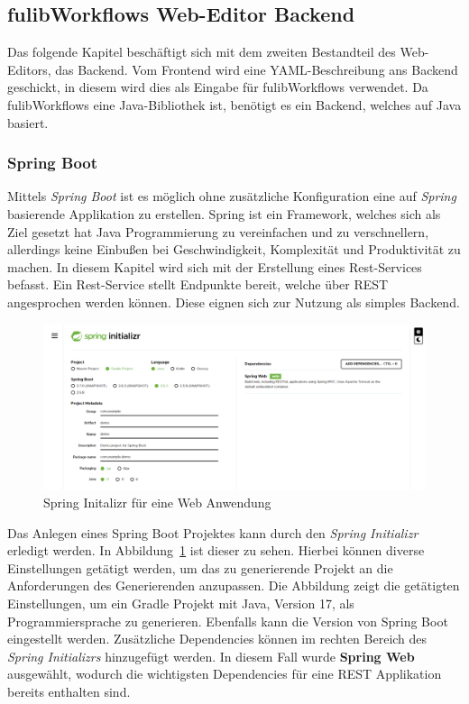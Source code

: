 \subsection{fulibWorkflows Web-Editor Backend}\label{subsec:backend}
Das folgende Kapitel beschäftigt sich mit dem zweiten Bestandteil des Web-Editors, das Backend.
Vom Frontend wird eine YAML-Beschreibung ans Backend geschickt, in diesem wird dies als Eingabe für fulibWorkflows verwendet.
Da fulibWorkflows eine Java-Bibliothek ist, benötigt es ein Backend, welches auf Java basiert.

\subsubsection{Spring Boot}
Mittels \textit{Spring Boot} ist es möglich ohne zusätzliche Konfiguration eine auf \textit{Spring} basierende Applikation zu erstellen.\cite*{springBoot}
Spring ist ein Framework, welches sich als Ziel gesetzt hat Java Programmierung zu vereinfachen und zu verschnellern, allerdings keine Einbußen
bei Geschwindigkeit, Komplexität und Produktivität zu machen.\cite*{spring}
In diesem Kapitel wird sich mit der Erstellung eines Rest-Services befasst.
Ein Rest-Service stellt Endpunkte bereit, welche über REST angesprochen werden können.
Diese eignen sich zur Nutzung als simples Backend.

\begin{figure}[h]
    \centering
    \includegraphics[width=1.0\textwidth]{images/2.2/spring-init}
    \caption{Spring Initalizr für eine Web Anwendung}
    \label{fig:spring-init}
\end{figure}


Das Anlegen eines Spring Boot Projektes kann durch den \textit{Spring Initializr} erledigt werden.\cite*{sbinit}
In Abbildung~\ref{fig:spring-init} ist dieser zu sehen.
Hierbei können diverse Einstellungen getätigt werden, um das zu generierende Projekt an die Anforderungen des Generierenden anzupassen.
Die Abbildung zeigt die getätigten Einstellungen, um ein Gradle Projekt mit Java, Version 17, als Programmiersprache zu generieren.
Ebenfalls kann die Version von Spring Boot eingestellt werden.
Zusätzliche Dependencies können im rechten Bereich des \textit{Spring Initializrs} hinzugefügt werden.
In diesem Fall wurde \textbf{Spring Web} ausgewählt, wodurch die wichtigsten Dependencies für eine REST Applikation bereits enthalten sind.

